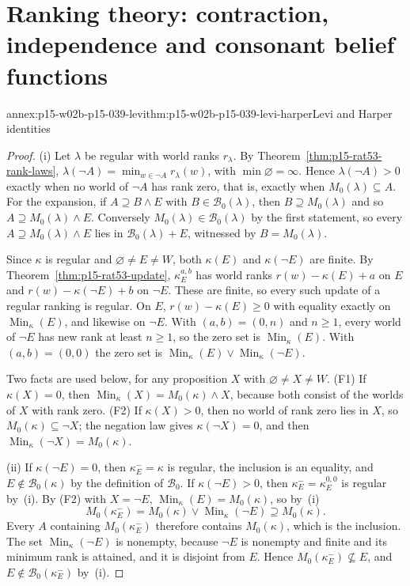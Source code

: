 \section{Ranking theory: contraction, independence and consonant belief functions}
\label{sec:p15-w02b-p15-039-annex}

\begin{annexitem}{annex:p15-w02b-p15-039-levi}{thm:p15-w02b-p15-039-levi-harper}{Levi and Harper identities}
\begin{proof}
(i) Let \(\lambda\) be regular with world ranks \(r_\lambda\).  By
Theorem~\ref{thm:p15-rat53-rank-laws},
\(\lambda(\neg A)=\min_{w\in\neg A}r_\lambda(w)\), with
\(\min\varnothing=\infty\).  Hence \(\lambda(\neg A)>0\) exactly when no
world of \(\neg A\) has rank zero, that is, exactly when
\(M_0(\lambda)\subseteq A\).  For the expansion, if
\(A\supseteq B\land E\) with \(B\in\mathcal B_0(\lambda)\), then
\(B\supseteq M_0(\lambda)\) and so \(A\supseteq M_0(\lambda)\land E\).
Conversely \(M_0(\lambda)\in\mathcal B_0(\lambda)\) by the first statement,
so every \(A\supseteq M_0(\lambda)\land E\) lies in
\(\mathcal B_0(\lambda)+E\), witnessed by \(B=M_0(\lambda)\).

Since \(\kappa\) is regular and \(\varnothing\ne E\ne W\), both
\(\kappa(E)\) and \(\kappa(\neg E)\) are finite.  By
Theorem~\ref{thm:p15-rat53-update}, \(\kappa^{a,b}_E\) has world ranks
\(r(w)-\kappa(E)+a\) on \(E\) and \(r(w)-\kappa(\neg E)+b\) on
\(\neg E\).  These are finite, so every such update of a regular ranking is
regular.  On \(E\), \(r(w)-\kappa(E)\geq0\) with equality exactly on
\(\operatorname{Min}_\kappa(E)\), and likewise on \(\neg E\).  With
\((a,b)=(0,n)\) and \(n\geq1\), every world of \(\neg E\) has new rank at
least \(n\geq1\), so the zero set is \(\operatorname{Min}_\kappa(E)\).  With
\((a,b)=(0,0)\) the zero set is
\(\operatorname{Min}_\kappa(E)\lor\operatorname{Min}_\kappa(\neg E)\).

Two facts are used below, for any proposition \(X\) with
\(\varnothing\ne X\ne W\).
(F1) If \(\kappa(X)=0\), then
\(\operatorname{Min}_\kappa(X)=M_0(\kappa)\land X\), because both consist
of the worlds of \(X\) with rank zero.
(F2) If \(\kappa(X)>0\), then no world of rank zero lies in \(X\), so
\(M_0(\kappa)\subseteq\neg X\); the negation law gives
\(\kappa(\neg X)=0\), and then
\(\operatorname{Min}_\kappa(\neg X)=M_0(\kappa)\).

(ii) If \(\kappa(\neg E)=0\), then \(\kappa^{-}_E=\kappa\) is regular, the
inclusion is an equality, and \(E\notin\mathcal B_0(\kappa)\) by the
definition of \(\mathcal B_0\).  If \(\kappa(\neg E)>0\), then
\(\kappa^{-}_E=\kappa^{0,0}_E\) is regular by~(i).  By (F2) with
\(X=\neg E\), \(\operatorname{Min}_\kappa(E)=M_0(\kappa)\), so by~(i)
\[
 M_0(\kappa^{-}_E)=M_0(\kappa)\lor\operatorname{Min}_\kappa(\neg E)
 \supseteq M_0(\kappa).
\]
Every \(A\) containing \(M_0(\kappa^{-}_E)\) therefore contains
\(M_0(\kappa)\), which is the inclusion.  The set
\(\operatorname{Min}_\kappa(\neg E)\) is nonempty, because \(\neg E\) is
nonempty and finite and its minimum rank is attained, and it is disjoint
from \(E\).  Hence \(M_0(\kappa^{-}_E)\not\subseteq E\), and
\(E\notin\mathcal B_0(\kappa^{-}_E)\) by~(i).


\end{proof}
\end{annexitem}
